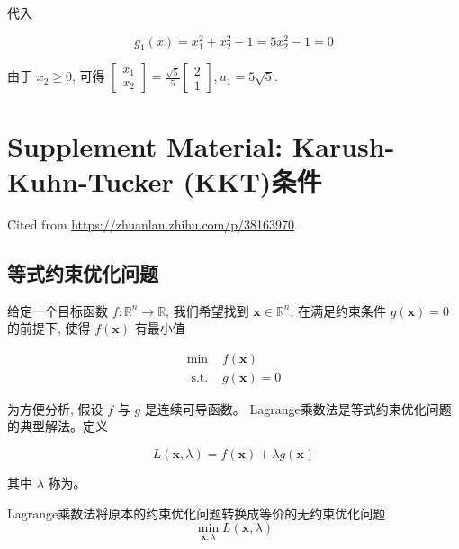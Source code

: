 \begin{example}
代入

$$g_{1}(x)=x_{1}^{2}+x_{2}^{2}-1=5 x_{2}^{2}-1=0$$


由于 $ x_{2} \geq 0 $, 可得 $ \left[\begin{array}{l}x_{1} \\ x_{2}\end{array}\right]=\frac{\sqrt{5}}{5}\left[\begin{array}{l}2 \\ 1\end{array}\right], u_{1}=5 \sqrt{5} $.

\end{example}

\section{Supplement Material: Karush-Kuhn-Tucker (KKT)条件}

Cited from \url{https://zhuanlan.zhihu.com/p/38163970}.

\subsection{等式约束优化问题}

\begin{problem}[等式约束优化问题]
    给定一个目标函数 $ f: \mathbb{R}^{n} \rightarrow \mathbb{R} $, 我们希望找到 $ \mathbf{x} \in \mathbb{R}^{n} $, 在满足约束条件 $ g(\mathbf{x})=0 $ 的前提下, 使得 $ f(\mathbf{x}) $ 有最小值

    $$
\begin{array}{ll}
\min & f(\mathbf{x}) \\
\text { s.t. } & g(\mathbf{x})=0
\end{array}
$$
\end{problem}

为方便分析, 假设 $ f $ 与 $ g $ 是连续可导函数。 Lagrange乘数法是等式约束优化问题的典型解法。定义

\begin{definition}[Lagrangian函数]
    $$
L(\mathbf{x}, \lambda)=f(\mathbf{x})+\lambda g(\mathbf{x})
$$
\end{definition}

其中 $ \lambda $ 称为。 

\begin{theorem}
    Lagrange乘数法将原本的约束优化问题转换成等价的无约束优化问题
$$
\min _{\mathbf{x}, \lambda} L(\mathbf{x}, \lambda)
$$
\end{theorem}

